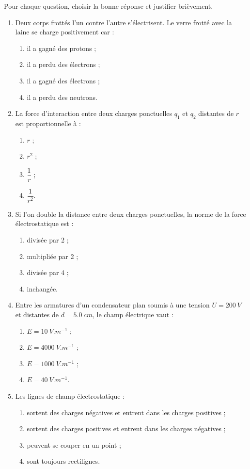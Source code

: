 \documentclass[11pt]{article}
\begin{document}
\begin{exercice}
Pour chaque question, choisir la bonne réponse et justifier brièvement.
\begin{enumerate}
\item Deux corps frottés l'un contre l'autre s'électrisent. Le verre frotté avec la laine se charge positivement car :
\begin{enumerate}
\item il a gagné des protons ;
\item il a perdu des électrons ;
\item il a gagné des électrons ;
\item il a perdu des neutrons.
\end{enumerate}
\item La force d'interaction entre deux charges ponctuelles $q_1$ et $q_2$ distantes de $r$ est proportionnelle à :
\begin{enumerate}
\item $r$ ; \item $r^2$ ; \item $\dfrac{1}{r}$ ; \item $\dfrac{1}{r^2}$.
\end{enumerate}
\item Si l'on double la distance entre deux charges ponctuelles, la norme de la force électrostatique est :
\begin{enumerate}
\item divisée par 2 ; \item multipliée par 2 ; \item divisée par 4 ; \item inchangée.
\end{enumerate}
\item Entre les armatures d'un condensateur plan soumis à une tension $U = \SI{200}{V}$ et distantes de $d = \SI{5,0}{cm}$, le champ électrique vaut :
\begin{enumerate}
\item $E = \SI{10}{V.m^{-1}}$ ; \item $E = \SI{4000}{V.m^{-1}}$ ; \item $E = \SI{1000}{V.m^{-1}}$ ; \item $E = \SI{40}{V.m^{-1}}$.
\end{enumerate}
\item Les lignes de champ électrostatique :
\begin{enumerate}
\item sortent des charges négatives et entrent dans les charges positives ;
\item sortent des charges positives et entrent dans les charges négatives ;
\item peuvent se couper en un point ;
\item sont toujours rectilignes.
\end{enumerate}
\end{enumerate}
\end{exercice}
\end{document}
